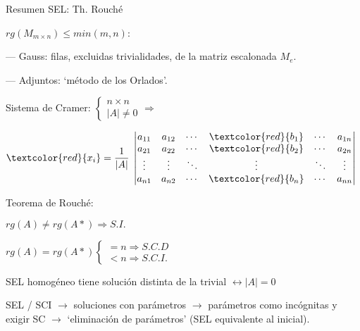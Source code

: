 \begin{myalertblock}{Resumen SEL: Th. Rouché}

$ rg(M_{m \times n}) \le min(m,n)$:

\vspace{2mm}
--- Gauss: filas, excluidas trivialidades, de la matriz escalonada $M_e$.

--- Adjuntos: `método de los Orlados'.

\vspace{4mm}
Sistema de Cramer: $\begin{cases} n \times n \\ |A|\neq 0 \end{cases} \Rightarrow \;$ 

\centerline{$ \textcolor{red}{x_i}= \dfrac 1 {|A|}\; \left| \begin{matrix} 
a_{11}& a_{12}& \cdots & \textcolor{red}{b_1} & \cdots & a_{1n} \\
a_{21}& a_{22}& \cdots & \textcolor{red}{b_2} & \cdots & a_{2n} \\
\vdots & \vdots & \ddots & \vdots & \ddots & \vdots \\
a_{n1}& a_{n2}& \cdots & \textcolor{red}{b_n} & \cdots & a_{nn} \\
 \end{matrix} \right|$}
 
 
 
 \vspace{4mm}
 Teorema de Rouché:
 
\hspace{20mm} $rg(A) \neq rg(A*) \Rightarrow S.I.$

\hspace{20mm} $rg(A)=rg(A*) \begin{cases}
=n \Rightarrow S.C.D \\
<n \Rightarrow S.C.I.	
\end{cases}$

\vspace{4mm}
SEL homogéneo tiene solución distinta de la trivial $\leftrightarrow |A|=0$

\vspace{4mm} SEL / SCI $\to$ soluciones con parámetros $\to$ parámetros como incógnitas y exigir SC $\to$ `eliminación de parámetros' (SEL equivalente al inicial).
 

	
\end{myalertblock}


\justify



